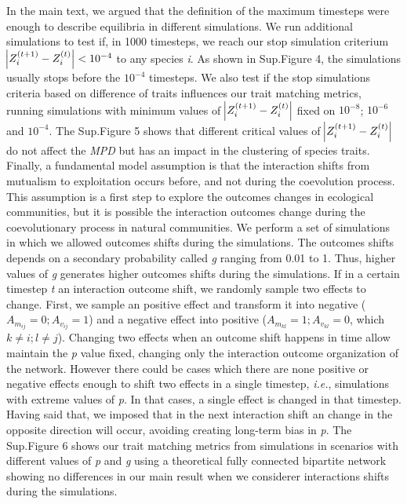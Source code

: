 \documentclass[a4paper, 12pt]{article}
\begin{document}
In the main text,  we argued  that the definition of the maximum timesteps were enough to describe equilibria in different simulations. We run additional simulations to test if, in 1000 timesteps, we reach  our stop simulation criterium $\abs{Z^{(t+1)}_{i} - Z^{(t)}_{i}} < 10^{-4}$ to any species \textit{i}. As shown in Sup.Figure 4, the simulations usually stops before the $10^{-4}$ timesteps. We also test if the stop simulations criteria based on difference of traits influences our trait matching metrics, running simulations with minimum values of $\abs{Z^{(t+1)}_{i} - Z^{(t)}_{i}}$ fixed on $10^{-8}$; $10^{-6}$ and $10^{-4}$. The Sup.Figure 5 shows that different critical values of $\abs{Z^{(t+1)}_{i} - Z^{(t)}_{i}}$ do not affect the \textit{MPD} but has an impact in the clustering of species traits. Finally, a fundamental model assumption is that the interaction shifts from mutualism to exploitation occurs before, and not during the coevolution process. This assumption is a first step  to explore the outcomes changes in ecological communities, but it is possible the interaction outcomes change during the coevolutionary process in natural communities. We perform a set of simulations in which we allowed outcomes shifts during the simulations. The outcomes shifts depends on a secondary probability called \textit{g} ranging from 0.01 to 1. Thus, higher values of \textit{g} generates higher outcomes shifts during the simulations. If in a certain timestep \textit{t} an interaction outcome shift, we randomly sample two effects to change. First, we sample an positive effect and transform it into negative ($A_{m_{ij}} = 0; A_{v_{ij}} = 1$) and a negative effect into positive ($A_{m_{kl}} = 1; A_{v_{kl}} = 0$, which $ k \neq i; l \neq j$). Changing two effects when an outcome shift happens in time allow maintain the \textit{p} value fixed, changing only the interaction outcome organization of the network. However there could be cases which there are none positive or negative effects enough to shift two effects in a single timestep, \textit{i.e.}, simulations with extreme values of \textit{p}. In that cases, a single effect is changed in that timestep. Having said that, we imposed that in the next interaction shift  an change in the opposite direction will occur, avoiding creating long-term bias in \textit{p}. The Sup.Figure 6 shows our trait matching metrics from simulations in scenarios with different values of \textit{p} and \textit{g} using a theoretical fully connected bipartite network showing no differences in our main result when we considerer interactions shifts during the simulations.
\end{document}
